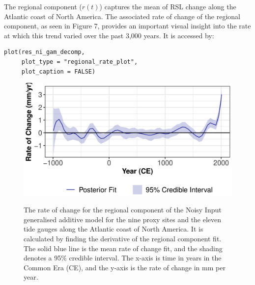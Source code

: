 \normalsize
The regional component (\(r(t)\)) captures the mean of RSL change along the Atlantic coast of North America. The associated rate of change of the regional component, as seen in Figure 7, provides an important visual insight into the rate at which this trend varied over the past 3,000 years. It is accessed by:
\scriptsize
\begin{verbatim}
plot(res_ni_gam_decomp, 
     plot_type = "regional_rate_plot",
     plot_caption = FALSE)
\end{verbatim}
\begin{figure}
{\centering \includegraphics[width=0.8\linewidth]{figures/regrateplot-1} 
}
\caption{The rate of change for the regional component of the Noisy Input generalised additive model for the nine proxy sites and the eleven tide gauges along the Atlantic coast of North America. It is calculated by finding the derivative of the regional component fit. The solid blue line is the mean rate of change fit, and the shading denotes a 95\% credible interval. The x-axis is time in years in the Common Era (CE), and the y-axis is the rate of change in mm per year.}\label{fig:regrateplotload}
\end{figure}
\normalsize
